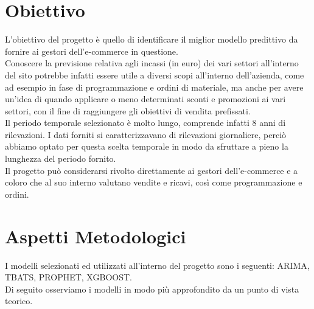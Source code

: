 \documentclass[12pt, a4paper, twocolumn]{article} %
\begin{document}
\section{Obiettivo}
L'obiettivo del progetto è quello di identificare il miglior modello predittivo da fornire ai gestori dell'e-commerce in questione.\\
Conoscere la previsione relativa agli incassi (in euro) dei vari settori all'interno del sito potrebbe infatti essere utile a diversi scopi all'interno dell'azienda, come ad esempio in fase di programmazione e ordini di materiale, ma anche per avere un'idea di quando applicare o meno determinati sconti e promozioni ai vari settori, con il fine di raggiungere gli obiettivi di vendita prefissati.\\
Il periodo temporale selezionato è molto lungo, comprende infatti 8 anni di rilevazioni. I dati forniti si caratterizzavano di rilevazioni giornaliere, perciò abbiamo optato per questa scelta temporale in modo da sfruttare a pieno la lunghezza del periodo fornito.\\
Il progetto può considerarsi rivolto direttamente ai gestori dell'e-commerce e a coloro che al suo interno valutano vendite e ricavi, così come programmazione e ordini.

\section{Aspetti Metodologici}
I modelli selezionati ed utilizzati all'interno del progetto sono i seguenti: ARIMA, TBATS, PROPHET, XGBOOST.\\
Di seguito osserviamo i modelli in modo più approfondito da un punto di vista teorico.
\end{document}
